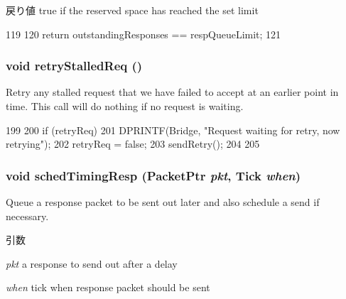 \begin{DoxyReturn}{戻り値}
true if the reserved space has reached the set limit 
\end{DoxyReturn}



\begin{DoxyCode}
119 {
120     return outstandingResponses == respQueueLimit;
121 }
\end{DoxyCode}
\hypertarget{classBridge_1_1BridgeSlavePort_a7b3f6456ef3aa1b8dcc6d1a20652453d}{
\subsubsection[{retryStalledReq}]{\setlength{\rightskip}{0pt plus 5cm}void retryStalledReq ()}}
\label{classBridge_1_1BridgeSlavePort_a7b3f6456ef3aa1b8dcc6d1a20652453d}
Retry any stalled request that we have failed to accept at an earlier point in time. This call will do nothing if no request is waiting. 


\begin{DoxyCode}
199 {
200     if (retryReq) {
201         DPRINTF(Bridge, "Request waiting for retry, now retrying\n");
202         retryReq = false;
203         sendRetry();
204     }
205 }
\end{DoxyCode}
\hypertarget{classBridge_1_1BridgeSlavePort_a31c2fe79e7cbd7319eb327074e412675}{
\subsubsection[{schedTimingResp}]{\setlength{\rightskip}{0pt plus 5cm}void schedTimingResp ({\bf PacketPtr} {\em pkt}, \/  {\bf Tick} {\em when})}}
\label{classBridge_1_1BridgeSlavePort_a31c2fe79e7cbd7319eb327074e412675}
Queue a response packet to be sent out later and also schedule a send if necessary.


\begin{DoxyParams}{引数}
\item[{\em pkt}]a response to send out after a delay \item[{\em when}]tick when response packet should be sent \end{DoxyParams}



